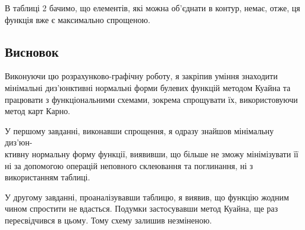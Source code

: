 \documentclass[14pt]{extreport}
\begin{document}
В таблиці 2 бачимо, що елементів,
які можна об'єднати в контур, немає,
отже, ця функція вже є максимально спрощеною.

\subsection*{Висновок}

Виконуючи цю розрахунково-графічну роботу, я
закріпив уміння знаходити мінімальні диз'юнктивні
нормальні форми булевих функцій методом Куайна та
працювати з функціональними схемами, зокрема
спрощувати їх, використовуючи метод карт Карно.

У першому завданні, виконавши спрощення, я
одразу знайшов мінімальну диз'юн-\\ктивну нормальну форму функції,
виявивши, що більше не зможу мінімізувати її ні за допомогою
операцій неповного склеювання та поглинання, ні з використанням
таблиці.

У другому завданні, проаналізувавши
таблицю, я виявив,
що функцію жодним чином спростити не вдасться.
Подумки застосувавши метод Куайна,
ще раз пересвідчився в цьому. Тому схему залишив
незміненою.
\end{document}
